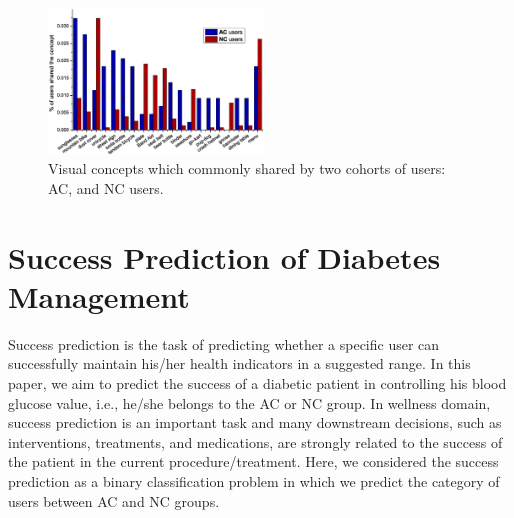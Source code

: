 \documentclass{acm_proc_article-sp}
\begin{document}
\begin{figure}
\centering
{\includegraphics[width=0.51\textwidth]{./figures/visual-concepts.eps}
\vspace{-0.7em}
\caption{Visual concepts which commonly shared by two cohorts of users: AC, and NC users.}\label{visual-concepts}}
\vspace{-0.6em}
\end{figure}

\section{Success Prediction of Diabetes Management}
Success prediction is the task of predicting whether a specific user can successfully maintain his/her health indicators in a suggested range. In this paper, we aim to predict the success of a diabetic patient in controlling his blood glucose value, i.e., he/she belongs to the AC or NC group. In wellness domain, success prediction is an important task and many downstream decisions, such as interventions, treatments, and medications,  are strongly related to the success of the patient in the current procedure/treatment. Here, we considered the success prediction as a binary classification problem in which we predict the category of users between AC and NC groups.

\end{document}
